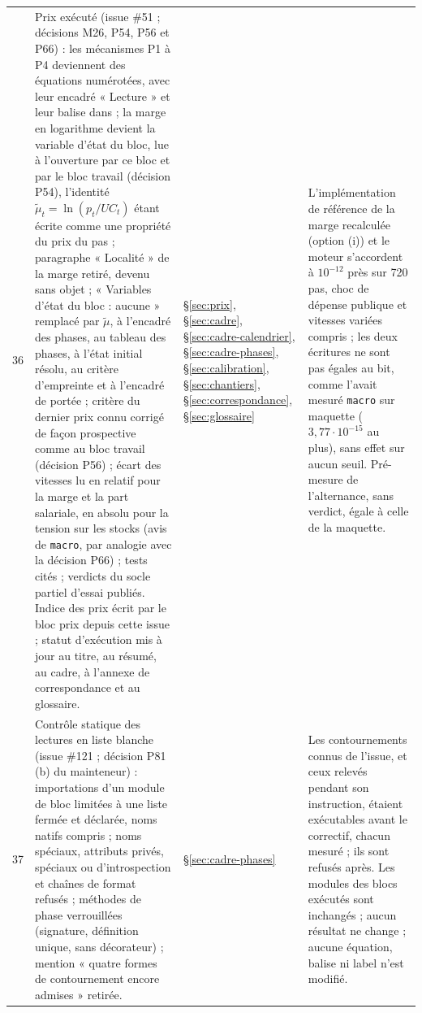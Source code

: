 \documentclass[11pt,a4paper]{article}
\newcommand{\code}[1]{\texttt{\detokenize{#1}}}
\begin{document}
\begin{center}
\begin{longtable}{p{0.5cm}>{\raggedright\arraybackslash}p{6.3cm}>{\raggedright\arraybackslash}p{2.1cm}>{\raggedright\arraybackslash}p{5.8cm}}
36 & Prix exécuté (issue \#51 ; décisions M26, P54, P56 et P66) : les mécanismes P1 à P4 deviennent des équations numérotées, avec leur encadré « Lecture » et leur balise dans \code{nations.blocs.prix} ; la marge en logarithme devient la variable d'état du bloc, lue à l'ouverture par ce bloc et par le bloc travail (décision P54), l'identité $\tilde\mu_t = \ln(p_t/\mathit{UC}_t)$ étant écrite comme une propriété du prix du pas ; paragraphe « Localité » de la marge retiré, devenu sans objet ; « Variables d'état du bloc : aucune » remplacé par $\tilde\mu$, à l'encadré des phases, au tableau des phases, à l'état initial résolu, au critère d'empreinte et à l'encadré de portée ; critère du dernier prix connu corrigé de façon prospective comme au bloc travail (décision P56) ; écart des vitesses lu en relatif pour la marge et la part salariale, en absolu pour la tension sur les stocks (avis de \texttt{macro}, par analogie avec la décision P66) ; tests cités ; verdicts du socle partiel d'essai publiés. Indice des prix écrit par le bloc prix depuis cette issue ; statut d'exécution mis à jour au titre, au résumé, au cadre, à l'annexe de correspondance et au glossaire. & \S\ref{sec:prix}, \S\ref{sec:cadre}, \S\ref{sec:cadre-calendrier}, \S\ref{sec:cadre-phases}, \S\ref{sec:calibration}, \S\ref{sec:chantiers}, \S\ref{sec:correspondance}, \S\ref{sec:glossaire} & L'implémentation de référence de la marge recalculée (option (i)) et le moteur s'accordent à $10^{-12}$ près sur 720 pas, choc de dépense publique et vitesses variées compris ; les deux écritures ne sont pas égales au bit, comme l'avait mesuré \texttt{macro} sur maquette ($3{,}77 \cdot 10^{-15}$ au plus), sans effet sur aucun seuil. Pré-mesure de l'alternance, sans verdict, égale à celle de la maquette.\\
37 & Contrôle statique des lectures en liste blanche (issue \#121 ; décision P81\,(b) du mainteneur) : importations d'un module de bloc limitées à une liste fermée et déclarée, noms natifs compris ; noms spéciaux, attributs privés, spéciaux ou d'introspection et chaînes de format refusés ; méthodes de phase verrouillées (signature, définition unique, sans décorateur) ; mention « quatre formes de contournement encore admises » retirée. & \S\ref{sec:cadre-phases} & Les contournements connus de l'issue, et ceux relevés pendant son instruction, étaient exécutables avant le correctif, chacun mesuré ; ils sont refusés après. Les modules des blocs exécutés sont inchangés ; aucun résultat ne change ; aucune équation, balise ni label n'est modifié.\\
\bottomrule
\end{longtable}
\end{center}
\end{document}
